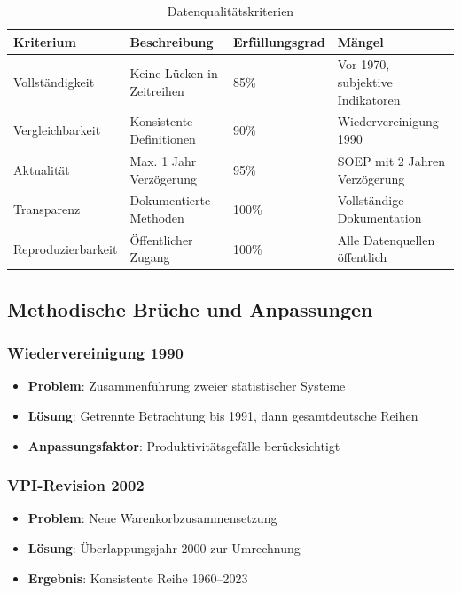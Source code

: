 \begin{table}[ht]
\centering
\begin{tabular}{llll}
\toprule
\textbf{Kriterium} & \textbf{Beschreibung} & \textbf{Erfüllungsgrad} & \textbf{Mängel} \\
\midrule
Vollständigkeit & Keine Lücken in Zeitreihen & 85\% & Vor 1970, subjektive Indikatoren \\
Vergleichbarkeit & Konsistente Definitionen & 90\% & Wiedervereinigung 1990 \\
Aktualität & Max. 1 Jahr Verzögerung & 95\% & SOEP mit 2 Jahren Verzögerung \\
Transparenz & Dokumentierte Methoden & 100\% & Vollständige Dokumentation \\
Reproduzierbarkeit & Öffentlicher Zugang & 100\% & Alle Datenquellen öffentlich \\
\bottomrule
\end{tabular}
\caption{Datenqualitätskriterien}
\label{tab:datenqualitaet}
\end{table}

\subsection{Methodische Brüche und Anpassungen}

\subsubsection{Wiedervereinigung 1990}
\begin{itemize}
\item \textbf{Problem}: Zusammenführung zweier statistischer Systeme
\item \textbf{Lösung}: Getrennte Betrachtung bis 1991, dann gesamtdeutsche Reihen
\item \textbf{Anpassungsfaktor}: Produktivitätsgefälle berücksichtigt
\end{itemize}

\subsubsection{VPI-Revision 2002}
\begin{itemize}
\item \textbf{Problem}: Neue Warenkorbzusammensetzung
\item \textbf{Lösung}: Überlappungsjahr 2000 zur Umrechnung
\item \textbf{Ergebnis}: Konsistente Reihe 1960--2023
\end{itemize}

